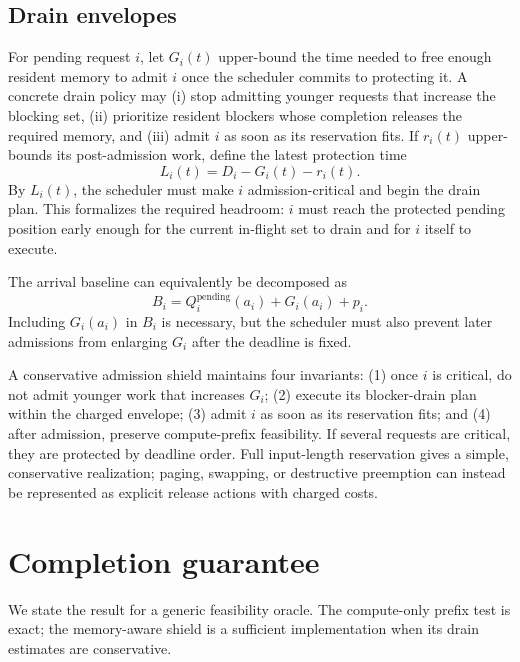 \documentclass{article}
\begin{document}
\subsection{Drain envelopes}

For pending request $i$, let $G_i(t)$ upper-bound the time needed to free enough
resident memory to admit $i$ once the scheduler commits to protecting it.  A
concrete drain policy may (i) stop admitting younger requests that increase the
blocking set, (ii) prioritize resident blockers whose completion releases the
required memory, and (iii) admit $i$ as soon as its reservation fits.  If
$r_i(t)$ upper-bounds its post-admission work, define the latest protection time
\begin{equation}
    L_i(t)=D_i-G_i(t)-r_i(t).
    \label{eq:latest-protection}
\end{equation}
By $L_i(t)$, the scheduler must make $i$ admission-critical and begin the drain
plan.  This formalizes the required headroom: $i$ must reach the protected
pending position early enough for the current in-flight set to drain and for
$i$ itself to execute.

The arrival baseline can equivalently be decomposed as
\begin{equation}
    B_i=Q_i^{\mathrm{pending}}(a_i)+G_i(a_i)+p_i.
    \label{eq:admission-baseline}
\end{equation}
Including $G_i(a_i)$ in $B_i$ is necessary, but the scheduler must also prevent
later admissions from enlarging $G_i$ after the deadline is fixed.

A conservative admission shield maintains four invariants: (1) once $i$ is
critical, do not admit younger work that increases $G_i$; (2) execute its
blocker-drain plan within the charged envelope; (3) admit $i$ as soon as its
reservation fits; and (4) after admission, preserve compute-prefix feasibility.
If several requests are critical, they are protected by deadline order.  Full
input-length reservation gives a simple, conservative realization; paging,
swapping, or destructive preemption can instead be represented as explicit
release actions with charged costs.

\section{Completion guarantee}
\label{sec:guarantee}

We state the result for a generic feasibility oracle.  The compute-only prefix
test is exact; the memory-aware shield is a sufficient implementation when its
drain estimates are conservative.
\end{document}
